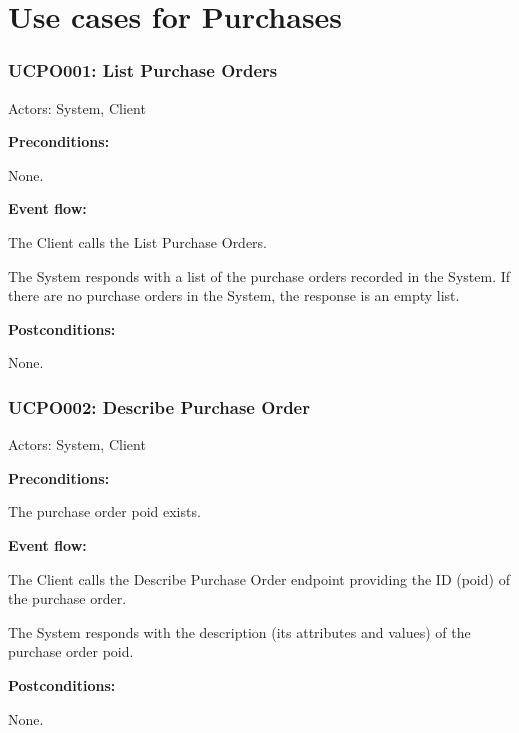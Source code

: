 \section{Use cases for Purchases}

\begin{ucbox}{\subsubsection{UCPO001: List Purchase Orders}}
\label{UCPO001}

Actors: System, Client

\textbf{Preconditions:}

\ucitem None.

\textbf{Event flow:}

\ucitem The Client calls the List Purchase Orders.

\ucitem The System responds with a list of the purchase orders recorded in the System. If there are no purchase orders in the System, the response is an empty list.

\textbf{Postconditions:}

\ucitem None.

\end{ucbox}

\begin{ucbox}{\subsubsection{UCPO002: Describe Purchase Order}}
\label{UCPO002}

Actors: System, Client

\textbf{Preconditions:} 

\ucitem The purchase order poid exists.

\textbf{Event flow:}

\ucitem The Client calls the Describe Purchase Order endpoint providing the ID (poid) of the purchase order.

\ucitem The System responds with the description (its attributes and values) of the purchase order poid.

\textbf{Postconditions:}

\ucitem None.

\end{ucbox}

